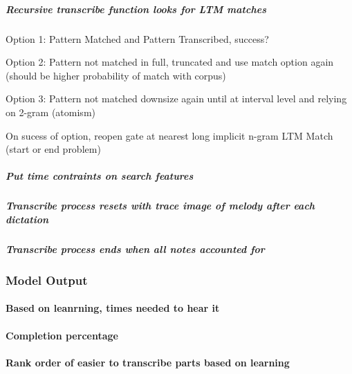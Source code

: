 \documentclass[]{book}
\let\oldparagraph\paragraph
\renewcommand{\paragraph}[1]{\oldparagraph{#1}\mbox{}}
\let\oldsubparagraph\subparagraph
\renewcommand{\subparagraph}[1]{\oldsubparagraph{#1}\mbox{}}
\theoremstyle{definition}
\theoremstyle{definition}
\theoremstyle{definition}
\theoremstyle{remark}
\begin{document}
\hypertarget{recursive-transcribe-function-looks-for-ltm-matches}{%
\subparagraph{Recursive transcribe function looks for LTM
matches}\label{recursive-transcribe-function-looks-for-ltm-matches}}

Option 1: Pattern Matched and Pattern Transcribed, success?

Option 2: Pattern not matched in full, truncated and use match option
again (should be higher probability of match with corpus)

Option 3: Pattern not matched downsize again until at interval level and
relying on 2-gram (atomism)

On sucess of option, reopen gate at nearest long implicit n-gram LTM
Match (start or end problem)

\hypertarget{put-time-contraints-on-search-features}{%
\subparagraph{Put time contraints on search
features}\label{put-time-contraints-on-search-features}}

\hypertarget{transcribe-process-resets-with-trace-image-of-melody-after-each-dictation}{%
\subparagraph{Transcribe process resets with trace image of melody after
each
dictation}\label{transcribe-process-resets-with-trace-image-of-melody-after-each-dictation}}

\hypertarget{transcribe-process-ends-when-all-notes-accounted-for}{%
\subparagraph{Transcribe process ends when all notes accounted
for}\label{transcribe-process-ends-when-all-notes-accounted-for}}

\hypertarget{model-output}{%
\subsubsection{Model Output}\label{model-output}}

\hypertarget{based-on-leanrning-times-needed-to-hear-it}{%
\paragraph{Based on leanrning, times needed to hear
it}\label{based-on-leanrning-times-needed-to-hear-it}}

\hypertarget{completion-percentage}{%
\paragraph{Completion percentage}\label{completion-percentage}}

\hypertarget{rank-order-of-easier-to-transcribe-parts-based-on-learning}{%
\paragraph{Rank order of easier to transcribe parts based on
learning}\label{rank-order-of-easier-to-transcribe-parts-based-on-learning}}
\end{document}
